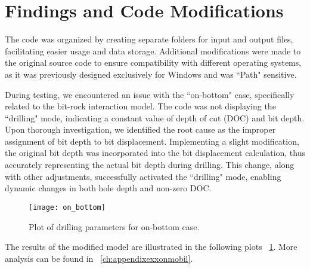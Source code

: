 \section{Findings and Code Modifications}
 
The code was organized by creating separate folders for input and output files, facilitating easier usage and data storage. Additional modifications were made to the original source code to ensure compatibility with different operating systems, as it was previously designed exclusively for Windows and was ``Path" sensitive.

During testing, we encountered an issue with the ``on-bottom" case, specifically related to the bit-rock interaction model. The code was not displaying the ``drilling" mode, indicating a constant value of depth of cut (DOC) and bit depth. Upon thorough investigation, we identified the root cause as the improper assignment of bit depth to bit displacement. Implementing a slight modification, the original bit depth was incorporated into the bit displacement calculation, thus accurately representing the actual bit depth during drilling. This change, along with other adjustments, successfully activated the ``drilling" mode, enabling dynamic changes in both hole depth and non-zero DOC.

\begin{figure}
  \centering
  \texttt{[image: on\_bottom]}
  \caption[Plots of on-bottom case]{Plot of drilling parameters for on-bottom case.}\label{findings}
\end{figure}

The results of the modified model are illustrated in the following plots \figurename~\ref{findings}. More analysis can be found in \appendixname~\ref{ch:appendixexxonmobil}. 